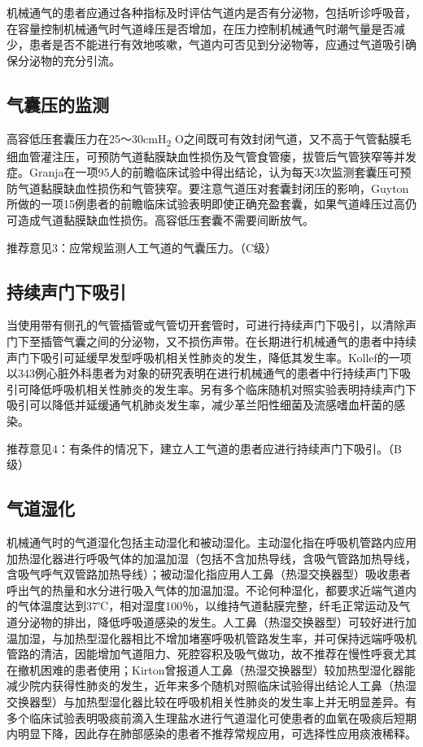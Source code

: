 机械通气的患者应通过各种指标及时评估气道内是否有分泌物，包括听诊呼吸音，在容量控制机械通气时气道峰压是否增加，在压力控制机械通气时潮气量是否减少，患者是否不能进行有效地咳嗽，气道内可否见到分泌物等，应通过气道吸引确保分泌物的充分引流。

\subsection{气囊压的监测}

高容低压套囊压力在25～30cmH\textsubscript{2}
O之间既可有效封闭气道，又不高于气管黏膜毛细血管灌注压，可预防气道黏膜缺血性损伤及气管食管瘘，拔管后气管狭窄等并发症。Granja在一项95人的前瞻临床试验中得出结论，认为每天3次监测套囊压可预防气道黏膜缺血性损伤和气管狭窄。要注意气道压对套囊封闭压的影响，Guyton所做的一项15例患者的前瞻临床试验表明即使正确充盈套囊，如果气道峰压过高仍可造成气道黏膜缺血性损伤。高容低压套囊不需要间断放气。

推荐意见3：应常规监测人工气道的气囊压力。（C级）

\subsection{持续声门下吸引}

当使用带有侧孔的气管插管或气管切开套管时，可进行持续声门下吸引，以清除声门下至插管气囊之间的分泌物，又不损伤声带。在长期进行机械通气的患者中持续声门下吸引可延缓早发型呼吸机相关性肺炎的发生，降低其发生率。Kollef的一项以343例心脏外科患者为对象的研究表明在进行机械通气的患者中行持续声门下吸引可降低呼吸机相关性肺炎的发生率。另有多个临床随机对照实验表明持续声门下吸引可以降低并延缓通气机肺炎发生率，减少革兰阳性细菌及流感嗜血杆菌的感染。

推荐意见4：有条件的情况下，建立人工气道的患者应进行持续声门下吸引。（B级）

\subsection{气道湿化}

机械通气时的气道湿化包括主动湿化和被动湿化。主动湿化指在呼吸机管路内应用加热湿化器进行呼吸气体的加温加湿（包括不含加热导线，含吸气管路加热导线，含吸气呼气双管路加热导线）；被动湿化指应用人工鼻（热湿交换器型）吸收患者呼出气的热量和水分进行吸入气体的加温加湿。不论何种湿化，都要求近端气道内的气体温度达到37℃，相对湿度100％，以维持气道黏膜完整，纤毛正常运动及气道分泌物的排出，降低呼吸道感染的发生。人工鼻（热湿交换器型）可较好进行加温加湿，与加热型湿化器相比不增加堵塞呼吸机管路发生率，并可保持远端呼吸机管路的清洁，因能增加气道阻力、死腔容积及吸气做功，故不推荐在慢性呼衰尤其在撤机困难的患者使用；Kirton曾报道人工鼻（热湿交换器型）较加热型湿化器能减少院内获得性肺炎的发生，近年来多个随机对照临床试验得出结论人工鼻（热湿交换器型）与加热型湿化器比较在呼吸机相关性肺炎的发生率上并无明显差异。有多个临床试验表明吸痰前滴入生理盐水进行气道湿化可使患者的血氧在吸痰后短期内明显下降，因此存在肺部感染的患者不推荐常规应用，可选择性应用痰液稀释。

